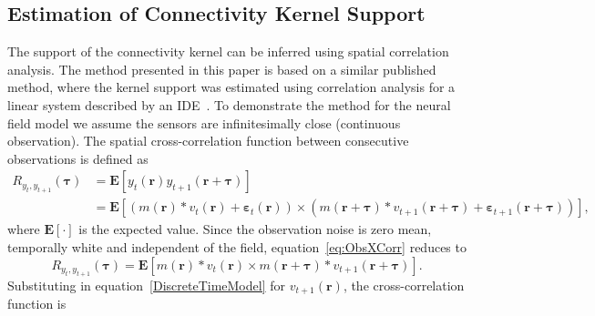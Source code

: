 \documentclass[]{article}
\begin{document}
\renewcommand{\theequation}{S1.\arabic{equation}}


\subsection*{Estimation of Connectivity Kernel Support}
The support of the connectivity kernel can be inferred using spatial correlation analysis. The method presented in this paper is based on a similar published method, where the kernel support was estimated using correlation analysis for a linear system described by an IDE~\cite{Scerri2009}. To demonstrate the method for the neural field model we assume the sensors are infinitesimally close (continuous observation). The spatial cross-correlation function between consecutive observations is defined as 
\begin{align}
	R_{y_{t},y_{t+1}}(\boldsymbol{\tau}) &= \mathbf{E}\left[ y_{t}\left(\mathbf{r}\right) y_{t+1}\left(\mathbf{r}+\boldsymbol{\tau}\right) \right] \\
	&= \mathbf{E}\left[\left(m\left(\mathbf{r}\right) \ast v_t\left(\mathbf{r}\right) + \boldsymbol{\varepsilon}_t\left(\mathbf{r}\right) \right) \times \left( m\left(\mathbf{r}+\boldsymbol{\tau}\right) \ast v_{t+1}\left(\mathbf{r}+\boldsymbol{\tau}\right) + \boldsymbol{\varepsilon}_{t+1}\left(\mathbf{r}+\boldsymbol{\tau}\right)\right) \right], \label{eq:ObsXCorr}
\end{align}
where $\mathbf{E}[\cdot]$ is the expected value. Since the observation noise is zero mean, temporally white and independent of the field, equation~\ref{eq:ObsXCorr} reduces to
\begin{equation}
	R_{y_{t},y_{t+1}}(\boldsymbol{\tau}) = \mathbf{E}\left[ m\left(\mathbf{r}\right) \ast v_t\left(\mathbf{r}\right) \times m\left(\mathbf{r}+\boldsymbol{\tau}\right) \ast v_{t+1}\left(\mathbf{r}+\boldsymbol{\tau}\right) \right].
\end{equation}
Substituting in equation~\ref{DiscreteTimeModel}  for $v_{t+1}\left(\mathbf{r}\right)$, the cross-correlation function is
\end{document}
